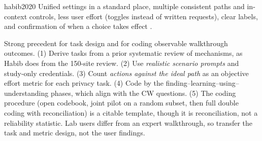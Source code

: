 \begin{papercard}{habib2020}
 Unified settings in a standard place, multiple consistent paths and in-context controls, less user effort (toggles instead of written requests), clear labels, and confirmation of when a choice takes effect .

 Strong precedent for task design and for coding observable walkthrough outcomes. (1) Derive tasks from a prior systematic review of mechanisms, as Habib does from the 150-site review. (2) Use \emph{realistic scenario prompts} and study-only credentials. (3) Count \emph{actions against the ideal path} as an objective effort metric for each privacy task. (4) Code by the finding--learning--using--understanding phases, which align with the CW questions. (5) The coding procedure (open codebook, joint pilot on a random subset, then full double coding with reconciliation) is a citable template, though it is reconciliation, not a reliability statistic. Lab users differ from an expert walkthrough, so transfer the task and metric design, not the user findings.
\end{papercard}
